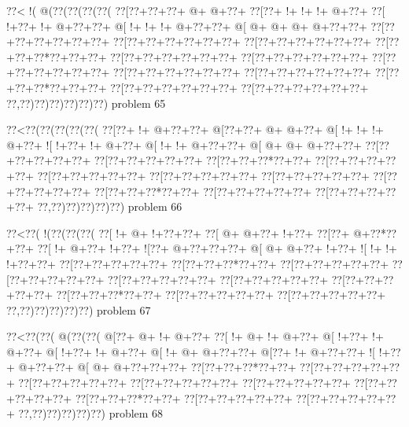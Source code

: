 \vbox{\vbox{\goo
\0??<\- !(\- @(\0??(\0??(\0??(\0??(
\0??[\0??+\0??+\0??+\- @+\- @+\0??+
\0??[\0??+\- !+\- !+\- !+\- @+\0??+
\0??[\- !+\0??+\- !+\- @+\0??+\0??+
\- @[\- !+\- !+\- !+\- @+\0??+\0??+
\- @[\- @+\- @+\- @+\- @+\0??+\0??+
\0??[\0??+\0??+\0??+\0??+\0??+\0??+
\0??[\0??+\0??+\0??+\0??+\0??+\0??+
\0??[\0??+\0??+\0??+\0??+\0??+\0??+
\0??[\0??+\0??+\0??*\0??+\0??+\0??+
\0??[\0??+\0??+\0??+\0??+\0??+\0??+
\0??[\0??+\0??+\0??+\0??+\0??+\0??+
\0??[\0??+\0??+\0??+\0??+\0??+\0??+
\0??[\0??+\0??+\0??+\0??+\0??+\0??+
\0??[\0??+\0??+\0??+\0??+\0??+\0??+
\0??[\0??+\0??+\0??*\0??+\0??+\0??+
\0??[\0??+\0??+\0??+\0??+\0??+\0??+
\0??[\0??+\0??+\0??+\0??+\0??+\0??+
\0??,\0??)\0??)\0??)\0??)\0??)\0??)
}
\hfil problem 65\hfil\break
}

\vbox{\vbox{\goo
\0??<\0??(\0??(\0??(\0??(\0??(
\0??[\0??+\- !+\- @+\0??+\0??+
\- @[\0??+\0??+\- @+\- @+\0??+
\- @[\- !+\- !+\- !+\- @+\0??+
\- ![\- !+\0??+\- !+\- @+\0??+
\- @[\- !+\- !+\- @+\0??+\0??+
\- @[\- @+\- @+\- @+\0??+\0??+
\0??[\0??+\0??+\0??+\0??+\0??+
\0??[\0??+\0??+\0??+\0??+\0??+
\0??[\0??+\0??+\0??*\0??+\0??+
\0??[\0??+\0??+\0??+\0??+\0??+
\0??[\0??+\0??+\0??+\0??+\0??+
\0??[\0??+\0??+\0??+\0??+\0??+
\0??[\0??+\0??+\0??+\0??+\0??+
\0??[\0??+\0??+\0??+\0??+\0??+
\0??[\0??+\0??+\0??*\0??+\0??+
\0??[\0??+\0??+\0??+\0??+\0??+
\0??[\0??+\0??+\0??+\0??+\0??+
\0??,\0??)\0??)\0??)\0??)\0??)
}
\hfil problem 66\hfil\break
}

\vbox{\vbox{\goo
\0??<\0??(\- !(\0??(\0??(\0??(
\0??[\- !+\- @+\- !+\0??+\0??+
\0??[\- @+\- @+\0??+\- !+\0??+
\0??[\0??+\- @+\0??*\0??+\0??+
\0??[\- !+\- @+\0??+\- !+\0??+
\- ![\0??+\- @+\0??+\0??+\0??+
\- @[\- @+\- @+\0??+\- !+\0??+
\- ![\- !+\- !+\- !+\0??+\0??+
\0??[\0??+\0??+\0??+\0??+\0??+
\0??[\0??+\0??+\0??*\0??+\0??+
\0??[\0??+\0??+\0??+\0??+\0??+
\0??[\0??+\0??+\0??+\0??+\0??+
\0??[\0??+\0??+\0??+\0??+\0??+
\0??[\0??+\0??+\0??+\0??+\0??+
\0??[\0??+\0??+\0??+\0??+\0??+
\0??[\0??+\0??+\0??*\0??+\0??+
\0??[\0??+\0??+\0??+\0??+\0??+
\0??[\0??+\0??+\0??+\0??+\0??+
\0??,\0??)\0??)\0??)\0??)\0??)
}
\hfil problem 67\hfil\break
}

\vbox{\vbox{\goo
\0??<\0??(\0??(\- @(\0??(\0??(
\- @[\0??+\- @+\- !+\- @+\0??+
\0??[\- !+\- @+\- !+\- @+\0??+
\- @[\- !+\0??+\- !+\- @+\0??+
\- @[\- !+\0??+\- !+\- @+\0??+
\- @[\- !+\- @+\- @+\0??+\0??+
\- @[\0??+\- !+\- @+\0??+\0??+
\- ![\- !+\0??+\- @+\0??+\0??+
\- @[\- @+\- @+\0??+\0??+\0??+
\0??[\0??+\0??+\0??*\0??+\0??+
\0??[\0??+\0??+\0??+\0??+\0??+
\0??[\0??+\0??+\0??+\0??+\0??+
\0??[\0??+\0??+\0??+\0??+\0??+
\0??[\0??+\0??+\0??+\0??+\0??+
\0??[\0??+\0??+\0??+\0??+\0??+
\0??[\0??+\0??+\0??*\0??+\0??+
\0??[\0??+\0??+\0??+\0??+\0??+
\0??[\0??+\0??+\0??+\0??+\0??+
\0??,\0??)\0??)\0??)\0??)\0??)
}
\hfil problem 68\hfil\break
}

